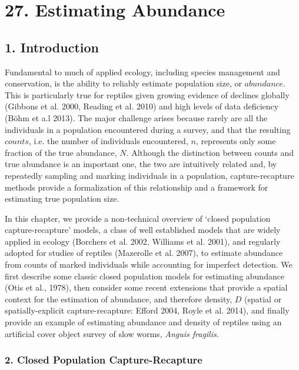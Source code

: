 \documentclass{book}
\begin{document}
\chapter*{27. Estimating Abundance\\
          }

\section*{1. Introduction}

Fundamental to much of applied ecology, including species management
and conservation, is the ability to reliably estimate population size,
or $abundance$. This is particularly true for reptiles given growing
evidence of declines globally (Gibbons et al. 2000, Reading et
al. 2010) and high levels of data deficiency (B{\"o}hm et a.l 2013). The
major challenge arises because rarely are all the individuals in a
population encountered during a survey, and that the
resulting $counts$, i.e. the number of individuals encountered, $n$,
represents only some fraction of the true abundance, $N$. Although the
distinction between counts and true abundance is an important one, the
two are intuitively related and, by repeatedly sampling and marking
individuals in a population, capture-recapture methods provide a
formalization of this relationship and a framework for estimating true
population size.

In this chapter, we provide a non-technical overview of `closed
population capture-recapture' models, a class of well established
models that are widely applied in ecology (Borchers et al. 2002,
Williams et al. 2001), and regularly adopted for studies of reptiles
(Mazerolle et al. 2007), to estimate abundance from counts of marked
individuals while accounting for imperfect detection. We first describe
some classic closed population models for estimating abundance (Otis
et al., 1978), then consider some recent extensions that provide a
spatial context for the estimation of abundance, and therefore
density, $D$ (spatial or spatially-explicit capture-recapture: Efford
2004, Royle et al. 2014), and finally provide an example of estimating
abundance and density of reptiles using an artificial cover object
survey of slow worms, \textit{Anguis fragilis}.

\subsection*{2. Closed Population Capture-Recapture}
\end{document}
